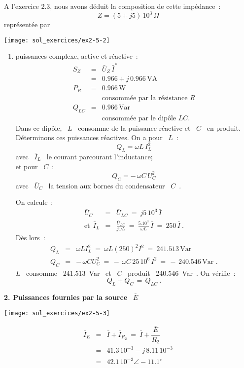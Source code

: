 A l'exercice 2.3, nous avons déduit la composition de cette impédance~:
\[ Z = (5 +j5) \, 10^3\, \Omega \]
représentée par
\begin{center}
	\texttt{[image: sol\_exercices/ex2-5-2]}
\end{center}

\begin{enumerate}
	\item puissances complexe, active et réactive~:
	\begin{eqnarray*}
		S_Z &=& \bar{U}_Z \, \bar{I}^{\ast}\\
		&=& 0.966 + j \, 0.966\, \text{VA}\\
		P_R &=& 0.966 \, \text{W} \\
		& & \text{consommée par la résistance~}R\\
		Q_{LC} & = &0.966 \, \text{Var} \\
		& & \text{consommée par le dipôle~}LC.
	\end{eqnarray*}
	Dans ce dipôle, \ $L$ \ consomme de la puissance réactive et \ $C$ \ en produit.
	Déterminons ces puissances réactives. On a pour \ $L$~:
	\[ Q_L = \omega L\, I_L^2 \]
	avec \ $\bar{I}_L$ \ le courant parcourant l'inductance;\\
	et pour \ $C$~: 
	\[ Q_C = -\, \omega C \, U_C^2 \]
	avec \ $\bar{U}_C$ \ la tension aux bornes du condensateur \ $C$~.
	
	On calcule~:
	\begin{eqnarray*}
		\bar{U}_C &=& \bar{U}_{LC} \: = \: j5 \, 10^3 \, \bar{I} \\
		\mbox{et} ~~\bar{I}_L &=& \frac{\bar{U}_{LC}}{j\omega L} \: = \: \frac{5.10^3}{\omega L} 
		\, \bar{I} \: = \: 250\, \bar{I}~.
	\end{eqnarray*}
	Dès lors~:
	\begin{eqnarray*}
		Q_L &=& \omega LI_L^2 \: = \: \omega L(250)^2 I^2 \: = \: 241.513 \, \text{Var}\\
		Q_C &=& -\, \omega C U_C^2 \: = \, - \, \omega C \, 25\, 10^6 \, I^2 
		\: = \, -\, 240.546\, \text{Var~.}
	\end{eqnarray*}
	$L$ \ consomme \ 241.513$\,$ Var \ et \ $C$ \ produit \ 240.546$\,$ Var~. On vérifie~: 
	\[ Q_L + Q_C \, = \, Q_{LC}~. \]
\end{enumerate}

{\bf 2. Puissances fournies par la source} \ $\bar{E}$

\parbox[c]{4cm}{
	\hfill
	\texttt{[image: sol\_exercices/ex2-5-3]}
}
\parbox[c]{8cm}{
	\begin{eqnarray*}
		\bar{I}_E &=& \bar{I} + \bar{I}_{R_2} \: = \: \bar{I} + \dfrac{\bar{E}}{R_2}\\
		&=& 41.3\, 10^{-3} - j\, 8.11 \, 10^{-3}\\
		&=& 42.1 \, 10^{-3} \angle -11.1^{\circ}
\end{eqnarray*}}

